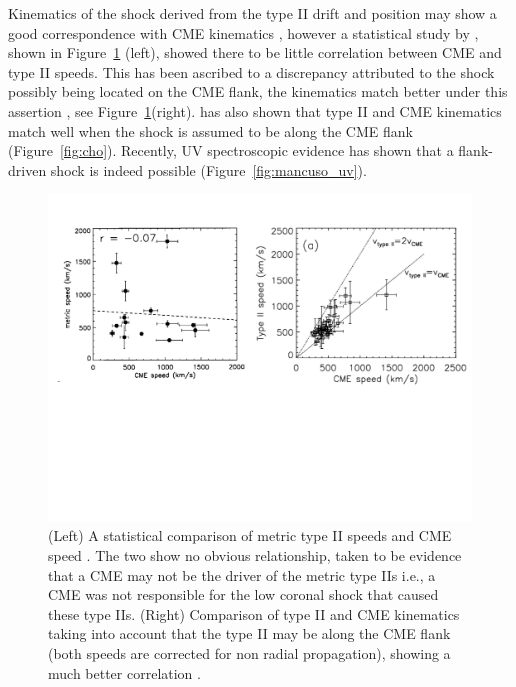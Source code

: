 Kinematics of the shock derived from the type II drift and position may show a good correspondence with CME kinematics \citep{mancuso2011}, however a statistical study by \citet{reiner2001}, shown in Figure~\ref{fig:reiner} (left), showed there to be little correlation between CME and type II speeds. This has been ascribed to a discrepancy attributed to the shock possibly being located on the CME flank, the kinematics match better under this assertion \citep{mancuso2004}, see Figure~\ref{fig:reiner}(right). \citet{cho2007, cho2012} has also shown that type II and CME kinematics match well when the shock is assumed to be along the CME flank (Figure~\ref{fig:cho}). Recently, UV spectroscopic evidence has shown that a flank-driven shock is indeed possible (Figure~\ref{fig:mancuso_uv}). 

\begin{figure}[t!]
\begin{center}
\includegraphics[trim=2cm 8cm 0cm 2.0cm, scale=0.5]{images/reiner_mancuso.pdf}
\caption[Statistical comparison of CME and type II height-time kinematics]{(Left) A statistical comparison of metric type II speeds and CME speed \citep{reiner2001}. The two show no obvious relationship, taken to be evidence that a CME may not be the driver of the metric type IIs i.e., a CME was not responsible for the low coronal shock that caused these type IIs. (Right) Comparison of type II and CME kinematics taking into account that the type II may be along the CME flank {\color{blue}(both speeds are corrected for non radial propagation)}, showing a much better correlation \citep{mancuso2004}.}
\label{fig:reiner}
\end{center}
\end{figure}

